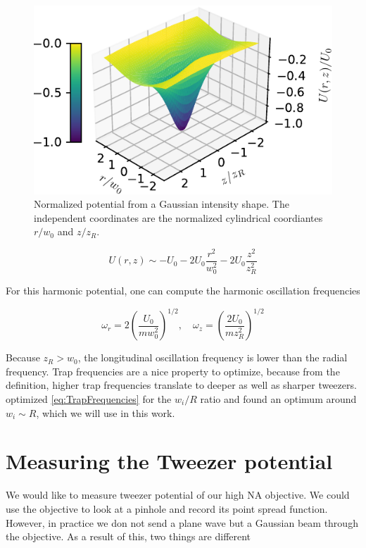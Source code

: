 \begin{figure}
    \centering
    \includegraphics[width=.56\linewidth]{figures/GaussianPotential.pdf}
    \caption{Normalized potential from a Gaussian intensity shape. The independent coordinates are the normalized cylindrical coordiantes $r/w_0$ and $z/z_R$.}
    \label{fig:GaussianPotential}
\end{figure}

\begin{equation}\label{eq:ApproximateGaussianPotential}
    U(r,z) \sim -U_0 - 2U_0 \frac{r^2}{w_0^2} - 2U_0 \frac{z^2}{z_R^2}
\end{equation}

For this harmonic potential, one can compute the harmonic oscillation frequencies 

\begin{equation}\label{eq:TrapFrequencies}
    \omega_r = 2\left(\frac{U_0}{m w_0^2}\right)^{1/2}, \quad
    \omega_z= \left(\frac{2 U_0}{m z_R^2}\right)^{1/2}
\end{equation}

Because $z_R > w_0$, the longitudinal oscillation frequency is lower than the radial frequency. 
Trap frequencies are a nice property to optimize, because from the definition, higher trap frequencies translate to deeper as well as sharper tweezers. 
\cite{Madjarov2021} optimized \cref{eq:TrapFrequencies} for the $w_i/R$ ratio and found an optimum around $w_i\sim R$, which we will use in this work. 


\section{Measuring the Tweezer potential}

We would like to measure tweezer potential of our high NA objective. We could use the objective to look at a pinhole and record its point spread function. However, in practice we don not send a plane wave but a Gaussian beam through the objective. As a result of this, two things are different \cite{Sortais2007}

